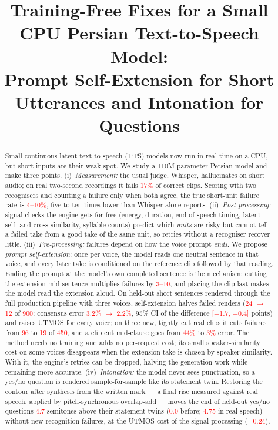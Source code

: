 \documentclass[conference]{IEEEtran}
\newcommand{\RES}[1]{\textcolor{red}{#1}}
\begin{document}
\title{Training-Free Fixes for a Small CPU Persian Text-to-Speech Model:\\
Prompt Self-Extension for Short Utterances and Intonation for Questions}

\author{
}

\maketitle

\begin{abstract}
Small continuous-latent text-to-speech (TTS) models now run in real time on a CPU, but short inputs are their
weak spot. We study a 110M-parameter Persian model and make three points. (i)~\emph{Measurement:} the usual
judge, Whisper, hallucinates on short audio; on real two-second recordings it fails \RES{17\%} of correct
clips. Scoring with two recognisers and counting a failure only when both agree, the true short-unit failure
rate is \RES{4--10\%}, five to ten times lower than Whisper alone reports. (ii)~\emph{Post-processing:}
signal checks the engine gets for free (energy, duration, end-of-speech timing, latent self- and
cross-similarity, syllable counts) predict which \emph{units} are risky but cannot tell a failed take from a
good take of the same unit, so retries without a recogniser recover little. (iii)~\emph{Pre-processing:}
failures depend on how the voice prompt \emph{ends}. We propose \emph{prompt self-extension}: once per
voice, the model reads one neutral sentence in that voice, and every later take is conditioned on the
reference clip followed by that reading. Ending the prompt at the model's own completed sentence is the
mechanism: cutting the extension mid-sentence multiplies failures by \RES{3--10}, and placing the clip last
makes the model read the extension aloud. On held-out short sentences rendered through the full production
pipeline with three voices, self-extension halves failed renders (\RES{24 $\to$ 12} of \RES{900}; consensus
error \RES{3.2\% $\to$ 2.2\%}, 95\% CI of the difference \RES{[$-$1.7, $-$0.4]} points) and raises UTMOS for
every voice; on three new, tightly cut real clips it cuts failures from \RES{96} to \RES{19} of \RES{450},
and a clip cut mid-clause goes from \RES{44\%} to \RES{3\%} error. The method needs no training and adds no per-request cost; its small
speaker-similarity cost on some voices disappears when the extension take is chosen by speaker similarity.
With it, the engine's retries can be dropped, halving the generation work while remaining more accurate.
(iv)~\emph{Intonation:} the model never sees punctuation, so a yes/no question is rendered sample-for-sample
like its statement twin. Restoring the contour after synthesis from the written mark --- a final rise
measured against real speech, applied by pitch-synchronous overlap-add --- moves the end of held-out yes/no
questions \RES{4.7} semitones above their statement twins (\RES{0.0} before; \RES{4.75} in real speech)
without new recognition failures, at the UTMOS cost of the signal processing (\RES{$-$0.24}).
\end{abstract}
\end{document}
